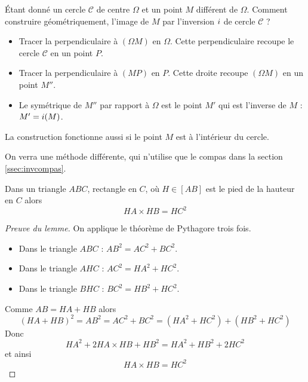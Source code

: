 \documentclass[11pt,class=report,crop=false]{standalone}
\begin{document}
\'Etant donné un cercle $\mathcal{C}$ de centre $\Omega$ et un point $M$
différent de $\Omega$. Comment construire géométriquement, 
l'image de $M$ par l'inversion $i$ de cercle $\mathcal{C}$ ?
\begin{itemize}
  \item Tracer la perpendiculaire à $(\Omega M)$ en $\Omega$. Cette perpendiculaire recoupe le cercle $\mathcal{C}$ en un point $P$.
  
  \item Tracer la perpendiculaire à $(MP)$ en $P$. Cette droite recoupe $(\Omega M)$ en un point $M''$. 
  
  \item Le symétrique de $M''$ par rapport à $\Omega$ est le point $M'$ qui est l'inverse de $M$ : $M' = i(M)$.

\end{itemize}






La construction fonctionne aussi si le point $M$ est à l'intérieur du cercle.


On verra une méthode différente, qui n'utilise que le compas dans la section \ref{ssec:invcompas}.
\begin{lemme}
Dans un triangle $ABC$, rectangle en $C$, où $H \in [AB]$ est le pied de la hauteur en $C$ alors 
$$HA \times HB = HC^2$$
\end{lemme}


\begin{proof}[Preuve du lemme]
On applique le théorème de Pythagore trois fois.
\begin{itemize}
  \item Dans le triangle $ABC$ : $AB^2 = AC^2 + BC^2$.
  
  \item Dans le triangle $AHC$ : $AC^2 = HA^2+HC^2$.
  
  \item Dans le triangle $BHC$ : $BC^2 = HB^2+HC^2$.   
\end{itemize}  
  Comme $AB = HA + HB$ alors 
  $$(HA + HB) ^2 = AB^2 = AC^2 + BC^2 = (HA^2+HC^2) + (HB^2+HC^2)$$
  Donc 
  $$HA^2 + 2 HA \times HB  + HB^2 = HA^2 + HB^2 + 2 HC^2$$
  et ainsi 
  $$HA \times HB = HC^2$$
  
\end{proof}
\end{document}
